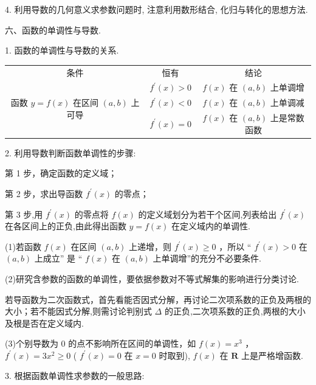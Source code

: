 4. 利用导数的几何意义求参数问题时, 注意利用数形结合, 化归与转化的思想方法.

六、函数的单调性与导数.

1. 函数的单调性与导数的关系.

\begin{center}
\begin{tabular}{|c|c|c|}
\hline
条件 & 恒有 & 结论 \\
\cline{1-3}
\multirow{3}{*}{函数 $y = f\left( x\right)$ 在区间 $\left( {a,b}\right)$ 上可导} & ${f}^{\prime }\left( x\right)  > 0$ & $f\left( x\right)$ 在 $\left( {a,b}\right)$ 上单调增 \\
\cline{2-3}
 & ${f}^{\prime }\left( x\right)  < 0$ & $f\left( x\right)$ 在 $\left( {a,b}\right)$ 上单调减 \\
\cline{2-3}
 & ${f}^{\prime }\left( x\right)  = 0$ & $f\left( x\right)$ 在 $\left( {a,b}\right)$ 上是常数函数 \\
\cline{1-3}
\hline
\end{tabular}
\end{center}

2. 利用导数判断函数单调性的步骤:

第 1 步，确定函数的定义域；

第 2 步，求出导函数 ${f}^{\prime }\left( x\right)$ 的零点；

第 3 步,用 ${f}^{\prime }\left( x\right)$ 的零点将 $f\left( x\right)$ 的定义域划分为若干个区间,列表给出 ${f}^{\prime }\left( x\right)$ 在各区间上的正负,由此得出函数 $y = f\left( x\right)$ 在定义域内的单调性.

(1)若函数 $f\left( x\right)$ 在区间 $\left( {a,b}\right)$ 上递增，则 ${f}^{\prime }\left( x\right)  \geq  0$ ，所以 “ ${f}^{\prime }\left( x\right)  > 0$ 在 $\left( {a,b}\right)$ 上成立” 是 “ $f\left( x\right)$ 在 $\left( {a,b}\right)$ 上单调增”的充分不必要条件.

(2)研究含参数的函数的单调性，要依据参数对不等式解集的影响进行分类讨论.

若导函数为二次函数式，首先看能否因式分解，再讨论二次项系数的正负及两根的大小；若不能因式分解,则需讨论判别式 $\Delta$ 的正负,二次项系数的正负,两根的大小及根是否在定义域内.

(3)个别导数为 0 的点不影响所在区间的单调性，如 $f\left( x\right)  = {x}^{3}$ ， ${f}^{\prime }\left( x\right)  = 3{x}^{2} \geq  0$ ( ${f}^{\prime }\left( x\right)  = 0$ 在 $x = 0$ 时取到), $f\left( x\right)$ 在 $\mathbf{R}$ 上是严格增函数.

3. 根据函数单调性求参数的一般思路:

